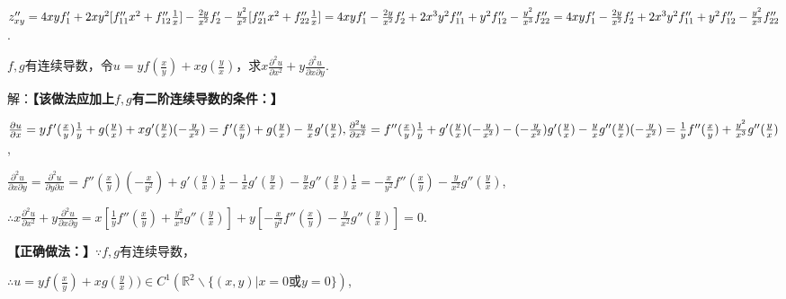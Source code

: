 \documentclass[12pt,UTF8]{ctexart}
\begin{document}
\begin{enumerate}
$z''_{xy}=4xyf'_1+2xy^2[f''_{11}x^2+f''_{12}\frac1x]-\frac{2y}{x^2}f'_2-\frac{y^2}{x^2}[f''_{21}x^2+f''_{22}\frac1x]\\
=4xyf'_1-\frac{2y}{x^2}f'_2+2x^3y^2f''_{11}+y^2f''_{12}-\frac{y^2}{x^3}f''_{22}\\
=4xyf'_1-\frac{2y}{x^2}f'_2+2x^3y^2f''_{11}+y^2f''_{12}-\frac{y^2}{x^3}f''_{22}$.

$f,g$有连续导数，令$u=yf(\frac xy)+xg(\frac yx)$，求$x\frac{\partial^2u}{\partial x^2}+y\frac{\partial^2u}{\partial x\partial y}$.

解：{\bf【该做法应加上$f,g$有二阶连续导数的条件：】}

$\frac{\partial u}{\partial x}=yf'(\frac xy)\frac1y+g(\frac yx)+xg'(\frac yx)(-\frac y{x^2})=f'(\frac xy)+g(\frac yx)-\frac yxg'(\frac yx),\\
\frac{\partial^2u}{\partial x^2}=f''(\frac xy)\frac1y+g'(\frac yx)(-\frac y{x^2})-(-\frac y{x^2})g'(\frac yx)-\frac yxg''(\frac yx)(-\frac y{x^2})=\frac1yf''(\frac xy)+\frac{y^2}{x^3}g''(\frac yx)$,

$\frac{\partial^2u}{\partial x\partial y}=\frac{\partial^2u}{\partial y\partial x}=f''(\frac xy)(-\frac x{y^2})+g'(\frac yx)\frac1x-\frac1xg'(\frac yx)-\frac yxg''(\frac yx)\frac1x=-\frac x{y^2}f''(\frac xy)-\frac y{x^2}g''(\frac yx)$,

$\therefore x\frac{\partial^2u}{\partial x^2}+y\frac{\partial^2u}{\partial x\partial y}=x[\frac1yf''(\frac xy)+\frac{y^2}{x^3}g''(\frac yx)]+y[-\frac x{y^2}f''(\frac xy)-\frac y{x^2}g''(\frac yx)]=0$.

{\bf【正确做法：】}$\because f,g$有连续导数，

$\therefore u=yf(\frac xy)+xg(\frac yx))\in C^1(\mathbb R^2\backslash\{(x,y)|x=0\text{或}y=0\})$,


\end{enumerate}
\end{document}
